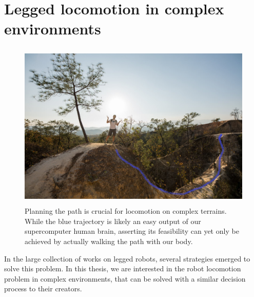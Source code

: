 \section{Legged locomotion in complex environments}
\begin{figure}[h]
    \centering
    \includegraphics[width=\textwidth, height=8cm, trim={10cm 0 0 8cm}, clip]{Figures/Chapter_INTRO/moi_chemin.jpg}
    \caption{Planning the path is crucial for locomotion on complex terrains. While the blue trajectory is likely an easy output of our supercomputer human brain, asserting its feasibility can yet only be achieved by actually walking the path with our body.}
    \label{fig:intro:moi_chemin}
\end{figure}
In the large collection of works on legged robots, several strategies emerged to solve this problem.
In this thesis, we are interested in the robot locomotion problem in complex environments, that can be solved with a similar decision process to their creators.

